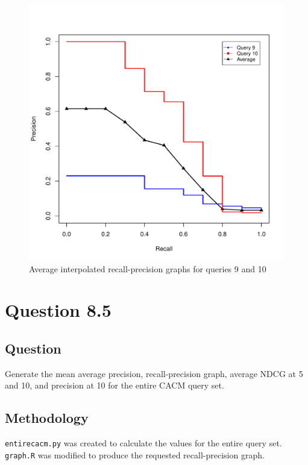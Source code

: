 \documentclass[10pt,letterpaper,bibliography=totoc]{scrartcl}
\begin{document}
\begin{figure}[h!]
\centering
\label{fig:int910}
\includegraphics[scale=.5]{int910.pdf}
\caption{Average interpolated recall-precision graphs for queries 9 and 10}
\end{figure}

\section{Question 8.5}
\subsection{Question}
Generate the mean average precision, recall-precision graph, average NDCG at 5 and 10, and precision at 10 for the entire CACM query set.

\subsection{Methodology}
\texttt{entirecacm.py} was created to calculate the values for the entire query set. \texttt{graph.R} was modified to produce the requested recall-precision graph. 
\end{document}
